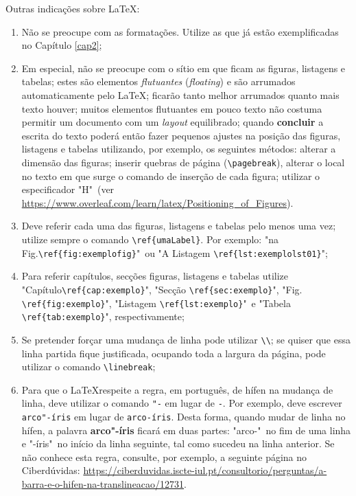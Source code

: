 Outras indicações sobre \LaTeX:
\begin{enumerate}
    \item Não se preocupe com as formatações. Utilize as que já estão exemplificadas no Capítulo \ref{cap2};
    \item Em especial, não se preocupe com o sítio em que ficam as figuras, listagens e tabelas; estes são elementos \textit{flutuantes} (\textit{floating}) e são arrumados automaticamente pelo \LaTeX;  ficarão tanto melhor arrumados quanto mais texto houver; muitos elementos flutuantes em pouco texto não costuma permitir um documento com um \textit{layout} equilibrado; quando \textbf{concluir} a escrita do texto poderá então fazer pequenos ajustes na posição das figuras, listagens e tabelas utilizando, por exemplo, os seguintes métodos: alterar a dimensão das figuras; inserir quebras de página (\verb|\pagebreak|), alterar o local no texto em que surge o comando de inserção de cada figura;
    utilizar o especificador "H"\ (ver \url{https://www.overleaf.com/learn/latex/Positioning_of_Figures}).
    \item Deve referir cada uma das figuras, listagens e tabelas pelo menos uma vez; utilize sempre o comando \verb|\ref{umaLabel}|. Por exemplo: "na Fig.\linebreak \verb|\ref{fig:exemplofig}|"\ ou "A Listagem \verb|\ref{lst:exemplolst01}|";
    \item Para referir capítulos, secções figuras, listagens e tabelas utilize "Capítulo\linebreak \verb|\ref{cap:exemplo}|", "Secção \verb|\ref{sec:exemplo}|", "Fig. \verb|\ref{fig:exemplo}|", "Listagem \verb|\ref{lst:exemplo}|"\ e "Tabela \verb|\ref{tab:exemplo}|", respectivamente;
    \item Se pretender forçar uma mudança de linha pode utilizar \verb|\\|; se quiser que essa linha partida fique justificada, ocupando toda a largura da página, pode utilizar o comando \verb|\linebreak|; 
    \item Para que o \LaTeX respeite a regra, em português, de hífen na mudança de linha, deve utilizar o comando \verb!"-! em lugar de \verb!-!. Por exemplo, deve escrever \verb!arco"-íris! em lugar de \verb!arco-íris!. Desta forma, quando mudar de linha no hífen, a palavra \textbf{arco"-íris} ficará em duas partes: "arco-"\ no fim de uma linha e  "-íris"\ no início da linha seguinte, tal como sucedeu na linha anterior. Se não conhece esta regra, consulte, por exemplo, a seguinte página no Ciberdúvidas: \url{https://ciberduvidas.iscte-iul.pt/consultorio/perguntas/a-barra-e-o-hifen-na-translineacao/12731}.
\end{enumerate}

